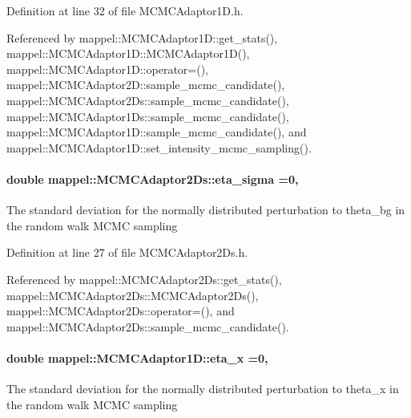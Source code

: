Definition at line 32 of file M\+C\+M\+C\+Adaptor1\+D.\+h.



Referenced by mappel\+::\+M\+C\+M\+C\+Adaptor1\+D\+::get\+\_\+stats(), mappel\+::\+M\+C\+M\+C\+Adaptor1\+D\+::\+M\+C\+M\+C\+Adaptor1\+D(), mappel\+::\+M\+C\+M\+C\+Adaptor1\+D\+::operator=(), mappel\+::\+M\+C\+M\+C\+Adaptor2\+D\+::sample\+\_\+mcmc\+\_\+candidate(), mappel\+::\+M\+C\+M\+C\+Adaptor2\+Ds\+::sample\+\_\+mcmc\+\_\+candidate(), mappel\+::\+M\+C\+M\+C\+Adaptor1\+Ds\+::sample\+\_\+mcmc\+\_\+candidate(), mappel\+::\+M\+C\+M\+C\+Adaptor1\+D\+::sample\+\_\+mcmc\+\_\+candidate(), and mappel\+::\+M\+C\+M\+C\+Adaptor1\+D\+::set\+\_\+intensity\+\_\+mcmc\+\_\+sampling().

\paragraph[{\texorpdfstring{eta\+\_\+sigma}{eta_sigma}}]{\setlength{\rightskip}{0pt plus 5cm}double mappel\+::\+M\+C\+M\+C\+Adaptor2\+Ds\+::eta\+\_\+sigma =0\hspace{0.3cm}{\ttfamily [protected]}, {\ttfamily [inherited]}}\hypertarget{classmappel_1_1MCMCAdaptor2Ds_ae5305087fd5abee9b38324be42d57a70}{}\label{classmappel_1_1MCMCAdaptor2Ds_ae5305087fd5abee9b38324be42d57a70}
The standard deviation for the normally distributed perturbation to theta\+\_\+bg in the random walk M\+C\+MC sampling 

Definition at line 27 of file M\+C\+M\+C\+Adaptor2\+Ds.\+h.



Referenced by mappel\+::\+M\+C\+M\+C\+Adaptor2\+Ds\+::get\+\_\+stats(), mappel\+::\+M\+C\+M\+C\+Adaptor2\+Ds\+::\+M\+C\+M\+C\+Adaptor2\+Ds(), mappel\+::\+M\+C\+M\+C\+Adaptor2\+Ds\+::operator=(), and mappel\+::\+M\+C\+M\+C\+Adaptor2\+Ds\+::sample\+\_\+mcmc\+\_\+candidate().

\paragraph[{\texorpdfstring{eta\+\_\+x}{eta_x}}]{\setlength{\rightskip}{0pt plus 5cm}double mappel\+::\+M\+C\+M\+C\+Adaptor1\+D\+::eta\+\_\+x =0\hspace{0.3cm}{\ttfamily [protected]}, {\ttfamily [inherited]}}\hypertarget{classmappel_1_1MCMCAdaptor1D_ae5787e38c9cef6168acf6fc5d3216693}{}\label{classmappel_1_1MCMCAdaptor1D_ae5787e38c9cef6168acf6fc5d3216693}
The standard deviation for the normally distributed perturbation to theta\+\_\+x in the random walk M\+C\+MC sampling 

